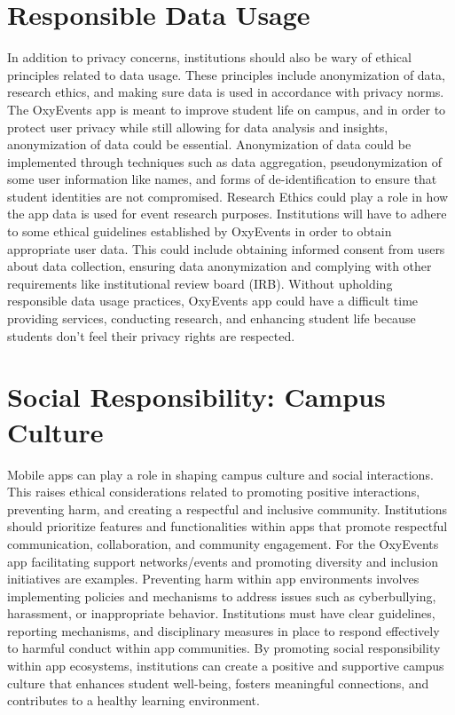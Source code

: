 \documentclass[10pt,twocolumn]{article}
\begin{document}
\section{Responsible Data Usage}
In addition to privacy concerns, institutions should also be wary of ethical principles related to data usage. These principles include anonymization of data, research ethics, and making sure data is used in accordance with privacy norms.
The OxyEvents app is meant to improve student life on campus, and in order to protect user privacy while still allowing for data analysis and insights, anonymization of data could be essential. Anonymization of data could be implemented through techniques such as data aggregation, pseudonymization of some user information like names, and forms of de-identification to ensure that student identities are not compromised. 
Research Ethics could play a role in how the app data is used for event research purposes. Institutions will have to adhere to some ethical guidelines established by OxyEvents in order to obtain appropriate user data. This could include obtaining informed consent from users about data collection, ensuring data anonymization and complying with other requirements like institutional review board (IRB).
Without upholding responsible data usage practices, OxyEvents app could have a difficult time providing services, conducting research, and enhancing student life because students don't feel their privacy rights are respected. 

\section{Social Responsibility: Campus Culture}
Mobile apps can play a role in shaping campus culture and social interactions. This raises ethical considerations related to promoting positive interactions, preventing harm, and creating a respectful and inclusive community.
Institutions should prioritize features and functionalities within apps that promote respectful communication, collaboration, and community engagement. For the OxyEvents app facilitating support networks/events and promoting diversity and inclusion initiatives are examples.
Preventing harm within app environments involves implementing policies and mechanisms to address issues such as cyberbullying, harassment, or inappropriate behavior. Institutions must have clear guidelines, reporting mechanisms, and disciplinary measures in place to respond effectively to harmful conduct within app communities.
By promoting social responsibility within app ecosystems, institutions can create a positive and supportive campus culture that enhances student well-being, fosters meaningful connections, and contributes to a healthy learning environment.
\end{document}
